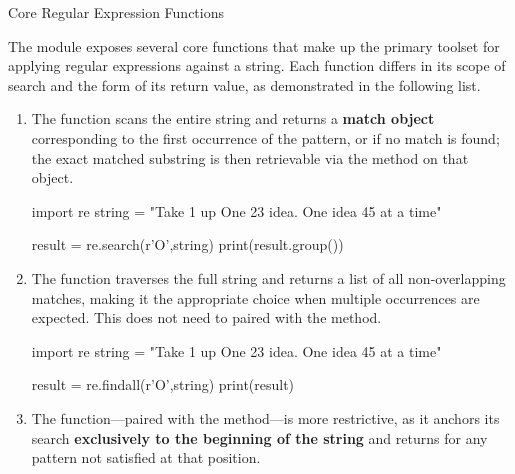 \documentclass[10pt]{article}
\begin{document}
  \begin{core}{Core Regular Expression Functions}

    The  module exposes several core functions that make up the primary toolset for applying regular expressions against a string. Each function differs in its scope of search and the form of its return value, as demonstrated in the following list.

    \begin{enumerate}

      \item The  function scans the entire string and returns a \textbf{match object} corresponding to the first occurrence of the pattern, or  if no match is found; the exact matched substring is then retrievable via the  method on that object.

      \begin{pyconsole}

        import re
        string = "Take 1 up One 23 idea. One idea 45 at a time"

        result = re.search(r'O\w',string)
        print(result.group())

      \end{pyconsole}

      \item The  function traverses the full string and returns a list of all non-overlapping matches, making it the appropriate choice when multiple occurrences are expected. This does not need to paired with the  method.

      \begin{pyconsole}

        import re
        string = "Take 1 up One 23 idea. One idea 45 at a time"

        result = re.findall(r'O\w\w',string)
        print(result)

      \end{pyconsole}

      \item The  function---paired with the  method---is more restrictive, as it anchors its search \textbf{exclusively to the beginning of the string} and returns  for any pattern not satisfied at that position.


\end{enumerate}
\end{core}
\end{document}
